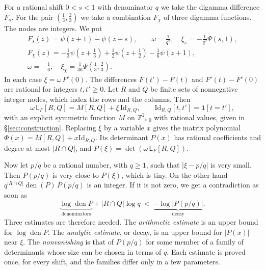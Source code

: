 \documentclass[11pt]{amsart}
\theoremstyle{definition}
\theoremstyle{remark}
\numberwithin{equation}{section}
\newcommand{\Z}{\mathbb Z}
\newcommand{\den}{\operatorname{den}}
\newcommand{\Lw}{\mathsf L}          %
\newcommand{\Id}{\mathrm{Id}}
\begin{document}
For a rational shift $0<s<1$ with denominator $q$ we take the digamma difference $F_s$. For the pair
$(\frac13,\frac23)$ we take a combination $F_\chi$ of three digamma functions. The nodes are integers. We put
\begin{equation}\label{eq:frames}
\begin{gathered}
 F_s(z)=\psi(z+1)-\psi(z+s),\qquad \omega=\tfrac1{q^2},\quad \xi_s=-\tfrac1{q^2}\Psi(s,1),\\
 F_{\chi}(z)=-\tfrac13\psi(z+\tfrac13)+\tfrac12\psi(z+\tfrac12)-\tfrac16\psi(z+1),\\
 \omega=-\tfrac16,\quad \xi_\chi=\tfrac1{36}\Psi(\tfrac13,\tfrac23).
\end{gathered}
\end{equation}
In each case $\xi=\omega\,F'(0)$. The differences $F(t')-F(t)$ and $F'(t)-F'(0)$ are rational for integers $t,t'\ge0$.
Let $R$ and $Q$ be finite sets of nonnegative integer nodes, which index the rows and the columns. Then
\begin{equation}\label{eq:shift}
 \omega\,\Lw_F[R,Q]=M[R,Q]+\xi\,\Id_{R,Q},\qquad \Id_{R,Q}[t,t']=\mathbf 1[t=t'],
\end{equation}
with an explicit symmetric function $M$ on $\Z_{\ge0}^2$ with rational values, given in \S\ref{sec:construction}.
Replacing $\xi$ by a variable $x$ gives the matrix polynomial $\Phi(x)=M[R,Q]+x\Id_{R,Q}$. Its determinant $P(x)$ has
rational coefficients and degree at most $|R\cap Q|$, and $P(\xi)=\det(\omega\,\Lw_F[R,Q])$.

Now let $p/q$ be a rational number, with $q\ge1$, such that $|\xi-p/q|$ is very small. Then $P(p/q)$ is very close
to $P(\xi)$, which is tiny. On the other hand $q^{|R\cap Q|}\den(P)\,P(p/q)$ is an integer. If it is not zero, we get a
contradiction as soon as
\[
 \underbrace{\log\den P}_{\text{denominators}}+|R\cap Q|\log q\ <\ \underbrace{-\log|P(p/q)|}_{\text{decay}} .
\]
Three estimates are therefore needed. The \emph{arithmetic estimate} is an upper bound for $\log\den P$. The
\emph{analytic estimate}, or decay, is an upper bound for $|P(x)|$ near $\xi$. The \emph{nonvanishing} is that of
$P(p/q)$ for some member of a family of determinants whose size can be chosen in terms of $q$. Each estimate is proved once, for every shift,
and the families differ only in a few parameters.
\end{document}
